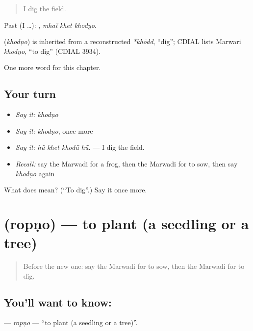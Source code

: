 \begin{quote}
I dig the field.
\end{quote}

Past (I …):   , \emph{mhaĩ khet khodyo}.

\begin{cousinweb}
\textbf{} (\emph{khodṇo}) is inherited from a reconstructed \emph{*khōdd}, \textquotedblleft{}dig\textquotedblright{}; CDIAL lists Marwari \emph{khodṇo}, \textquotedblleft{}to dig\textquotedblright{} (CDIAL 3934).
\end{cousinweb}

\begin{grammarlens}[title={What you've built}]
One more word for this chapter.
\end{grammarlens}

\subsection*{Your turn}
\begin{itemize}
\raggedright
  \item \emph{Say it:} \emph{khodṇo}
  \item \emph{Say it:} \emph{khodṇo}, once more
  \item \emph{Say it:} \emph{hū̃ khet khodū̃ hū̃.} — I dig the field.
  \item \emph{Recall:} say the Marwadi for a frog, then the Marwadi for to sow, then say \emph{khodṇo} again
\end{itemize}

\begin{tcolorbox}[breakable,colback=teal!4,colframe=teal!35!black,title={Before you move on}]
What does  mean? (\textquotedblleft{}To dig\textquotedblright{}.) Say it once more.
\end{tcolorbox}
\section[\texorpdfstring{\mw{रोपणो} (ropṇo)}{रोपणो (ropṇo)}]{ (ropṇo) — to plant (a seedling or a tree)}

\label{lesson:MW-C238-ropno}



\begin{quote}
Before the new one: say the Marwadi for to sow, then the Marwadi for to dig.
\end{quote}

\subsection*{You'll want to know: }
\textbf{} — \emph{ropṇo} — \textquotedblleft{}to plant (a seedling or a tree)\textquotedblright{}.

